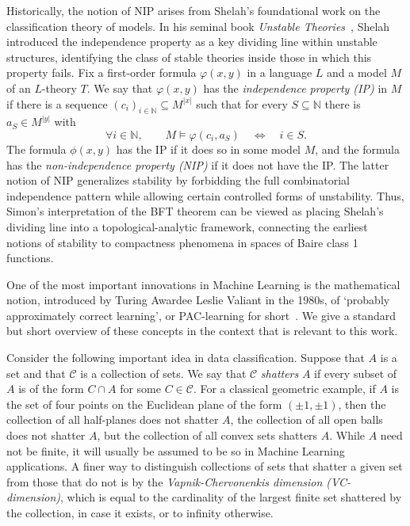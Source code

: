 \documentclass[psamsfonts]{amsart}
\theoremstyle{definition}
\theoremstyle{remark}
\numberwithin{equation}{section}
\begin{document}
Historically, the notion of NIP arises from Shelah's foundational work on the classification theory of models. In his seminal book \emph{Unstable Theories}~\cite{shelah1978unstable}, Shelah introduced the independence property as a key dividing line within unstable structures, identifying the class of stable theories inside those in which this property fails. Fix a first-order formula $\varphi(x,y)$ in a language $L$ and a model $M$ of an $L$-theory $T$. We say that $\varphi(x,y)$ has the \emph{independence property (IP)} in $M$ if there is a sequence $(c_i)_{i\in\mathbb N}\subseteq M^{|x|}$ such that for every $S\subseteq\mathbb N$ there is $a_S\in M^{|y|}$ with $$\forall i\in\mathbb N,\qquad M\models\varphi(c_i,a_S)\quad\iff\quad i\in S.$$ The formula $\phi(x,y)$ has the IP if it does so in some model $M$, and the formula has the \emph{non-independence property (NIP)} if it does not have the IP. The latter notion of NIP generalizes stability by forbidding the full combinatorial independence pattern while allowing certain controlled forms of unstability. Thus, Simon's interpretation of the BFT theorem can be viewed as placing Shelah's dividing line into a topological-analytic framework, connecting the earliest notions of stability to compactness phenomena in spaces of Baire class 1 functions.

One of the most important innovations in Machine Learning is the mathematical notion, introduced by Turing Awardee Leslie Valiant in the 1980s, of ‘probably approximately correct learning’, or PAC-learning for short~\cite{bendavid2019understanding}. We give a standard but short overview of these concepts in the context that is relevant to this work.

Consider the following important idea in data classification. Suppose that $A$ is a set and that $\mathcal C$ is a collection of sets. We say that $\mathcal C$ \emph{shatters} $A$ if every subset of $A$ is of the form $C\cap A$ for some $C\in\mathcal C$. For a classical geometric example, if $A$ is the set of four points on the Euclidean plane of the form $(\pm1,\pm1)$, then the collection of all half-planes does not shatter $A$, the collection of all open balls does not shatter $A$, but the collection of all convex sets shatters $A$. While $A$ need not be finite, it will usually be assumed to be so in Machine Learning applications. A finer way to distinguish collections of sets that shatter a given set from those that do not is by the \emph{Vapnik-Chervonenkis dimension (VC-dimension)}, which is equal to the cardinality of the largest finite set shattered by the collection, in case it exists, or to infinity otherwise.
\end{document}
